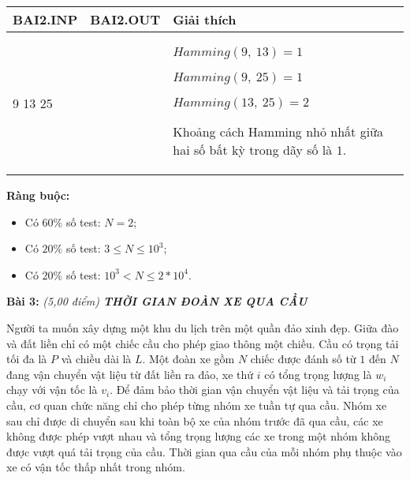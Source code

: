 \documentclass[
]{article}
\begin{document}
\begin{longtable}[]{@{}
  >{\raggedright\arraybackslash}p{}
  >{\raggedright\arraybackslash}p{}
  >{\raggedright\arraybackslash}p{}
  >{\raggedright\arraybackslash}p{}@{}}
\toprule\noalign{}
\begin{minipage}[b]{\linewidth}\centering
\textbf{BAI2.INP}
\end{minipage} & \begin{minipage}[b]{\linewidth}\centering
\textbf{BAI2.OUT}
\end{minipage} & \begin{minipage}[b]{\linewidth}\centering
\textbf{Giải thích}
\end{minipage} & \begin{minipage}[b]{\linewidth}\centering
\end{minipage} \\
\midrule\noalign{}
\endhead
\bottomrule\noalign{}
\endlastfoot
3

9 13 25 & 1 & $Hamming(9,\ 13) = 1$

$Hamming(9,\ 25) = 1$

$Hamming(13,\ 25) = 2$

Khoảng cách Hamming nhỏ nhất giữa hai số bất kỳ trong dãy số là $1$.
& \\
\end{longtable}

\textbf{Ràng buộc:}

\begin{itemize}
\item
  Có $60\%$ số test: $N = 2$;
\item
  Có $20\%$ số test: $3 \leq N \leq 10^{3}$;
\item
  Có $20\%$ số test: $10^{3} < N \leq 2*10^{4}$.
\end{itemize}

\textbf{Bài 3:} \it{(5,00 điểm)} \textbf{THỜI GIAN ĐOÀN XE QUA CẦU}

Người ta muốn xây dựng một khu du lịch trên một quần đảo xinh đẹp. Giữa
đào và đất liền chỉ có một chiếc cầu cho phép giao thông một chiều. Cầu
có trọng tải tối đa là $P$ và chiều dài là $L$. Một đoàn xe gồm
$N$ chiếc được đánh số từ $1$ đến $N$ đang vận chuyển vật liệu từ
đất liền ra đảo, xe thứ $i$ có tổng trọng lượng là $w_{i}$ chạy với
vận tốc là $v_{i}$. Để đảm bảo thời gian vận chuyển vật liệu và tải
trọng của cầu, cơ quan chức năng chỉ cho phép từng nhóm xe tuần tự qua
cầu. Nhóm xe sau chỉ được di chuyển sau khi toàn bộ xe của nhóm trước đã
qua cầu, các xe không được phép vượt nhau và tổng trọng lượng các xe
trong một nhóm không được vượt quá tải trọng của cầu. Thời gian qua cầu
của mỗi nhóm phụ thuộc vào xe có vận tốc thấp nhất trong nhóm.
\end{document}
